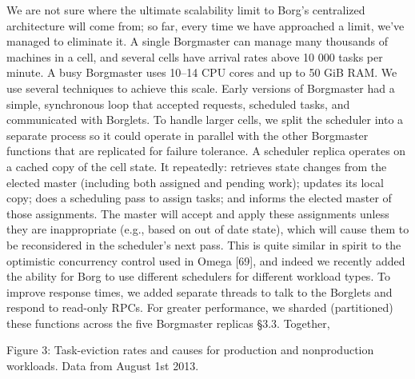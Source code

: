 We are not sure where the ultimate scalability limit to Borg’s
centralized architecture will come from; so far, every time
we have approached a limit, we’ve managed to eliminate it.
A single Borgmaster can manage many thousands of machines in a cell, and several cells have arrival rates above
10 000 tasks per minute. A busy Borgmaster uses 10–14
CPU cores and up to 50 GiB RAM. We use several techniques to achieve this scale.
Early versions of Borgmaster had a simple, synchronous
loop that accepted requests, scheduled tasks, and communicated with Borglets. To handle larger cells, we split the
scheduler into a separate process so it could operate in parallel with the other Borgmaster functions that are replicated for
failure tolerance. A scheduler replica operates on a cached
copy of the cell state. It repeatedly: retrieves state changes
from the elected master (including both assigned and pending work); updates its local copy; does a scheduling pass
to assign tasks; and informs the elected master of those assignments. The master will accept and apply these assignments unless they are inappropriate (e.g., based on out of
date state), which will cause them to be reconsidered in the
scheduler’s next pass. This is quite similar in spirit to the
optimistic concurrency control used in Omega [69], and indeed we recently added the ability for Borg to use different
schedulers for different workload types.
To improve response times, we added separate threads
to talk to the Borglets and respond to read-only RPCs. For
greater performance, we sharded (partitioned) these functions across the five Borgmaster replicas §3.3. Together,


Figure 3: Task-eviction rates and causes for production and nonproduction workloads. Data from August 1st 2013.

